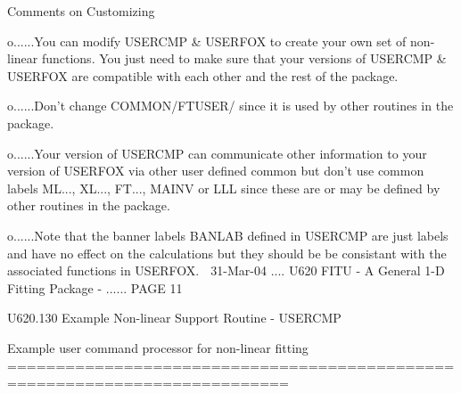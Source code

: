  
                             Comments on Customizing
 
   o......You can  modify  USERCMP  &  USERFOX  to  create  your  own  set  of
          non-linear  functions. You just need to make sure that your versions
          of USERCMP & USERFOX are compatible with each other and the rest  of
          the package.
 
   o......Don't  change  COMMON/FTUSER/  since it is used by other routines in
          the package.
 
   o......Your version of USERCMP can communicate other  information  to  your
          version  of  USERFOX  via  other  user  defined common but don't use
          common labels ML..., XL..., FT..., MAINV or LLL since these  are  or
          may be defined by other routines in the package.
 
   o......Note  that  the  banner  labels  BANLAB  defined in USERCMP are just
          labels and have no effect on the calculations but they should be  be
          consistant with the associated functions in USERFOX.
    
   31-Mar-04 .... U620  FITU - A General 1-D Fitting Package - ...... PAGE  11
 
 
   U620.130  Example Non-linear Support Routine - USERCMP
 
   Example user command processor for non-linear fitting
   ===========================================================================
 
